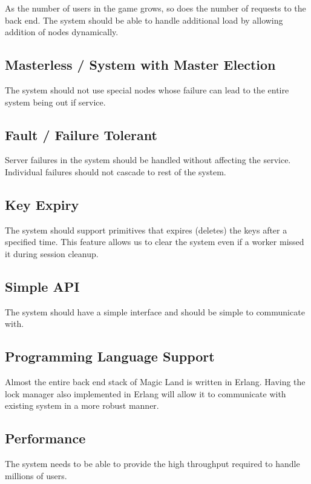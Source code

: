As the number of users in the game grows, so does the number of requests to
the back end. The system should be able to handle additional load by allowing
addition of nodes dynamically.


\subsection{Masterless / System with Master Election}


The system should not use special nodes whose failure can lead to the
entire system being out if service.

\subsection{Fault / Failure Tolerant}


Server failures in the system should be handled without affecting the service.
Individual failures should not cascade to rest of the system.

\subsection{Key Expiry}


The system should support primitives that expires (deletes) the keys after
a specified time. This feature allows us to clear the system even if a
worker missed it during session cleanup.

\subsection{Simple API}


The system should have a simple interface and should be simple to communicate
with.

\subsection{Programming Language Support}


Almost the entire back end stack of Magic Land is written in Erlang. Having the
lock manager also implemented in Erlang will allow it to communicate with
existing system in a more robust manner.

\subsection{Performance}


The system needs to be able to provide the high throughput required to handle
millions of users.

